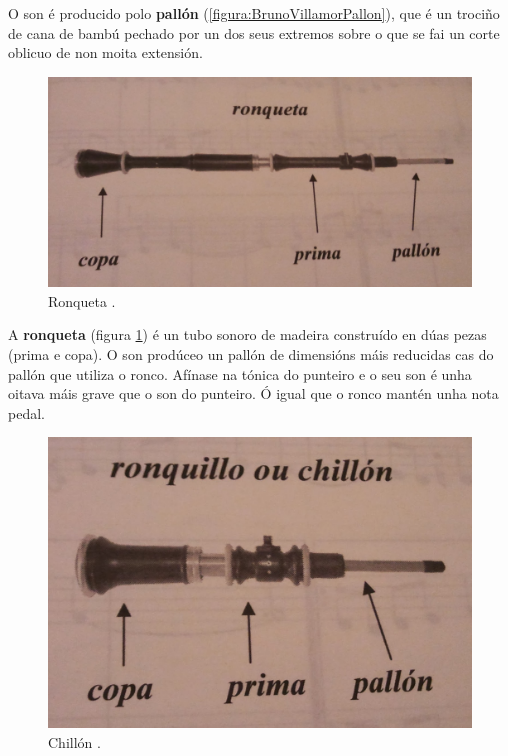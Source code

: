  O son é producido polo \textbf{pallón} (\ref{figura:BrunoVillamorPallon}), que
 é un trociño de cana de bambú pechado por un dos seus extremos sobre o que se
 fai un corte oblicuo de non moita extensión. \\

 \begin{figure}[htbp]
  \centering
  \includegraphics[scale=0.1,keepaspectratio=true]{./imagenes/bruno-villamor-ronqueta.jpg}
  \caption[Ronqueta]{Ronqueta \cite{BrunoVillamorCaderno15}.}
  \label{figura:BrunoVillamorRonqueta}
 \end{figure}

 A \textbf{ronqueta} (figura \ref{figura:BrunoVillamorRonqueta}) é un tubo
 sonoro de madeira construído en dúas pezas (prima e copa). O son prodúceo un
 pallón de dimensións máis reducidas cas do pallón que utiliza o ronco. Afínase
 na tónica do punteiro e o seu son é unha oitava máis grave que o son do
 punteiro. Ó igual que o ronco mantén unha nota pedal. \\

 \begin{figure}[htbp]
  \centering
  \includegraphics[scale=0.1,keepaspectratio=true]{./imagenes/bruno-villamor-chillon.jpg}
  \caption[Chillón]{Chillón \cite{BrunoVillamorCaderno15}.}
  \label{figura:BrunoVillamorChillon}
 \end{figure}

